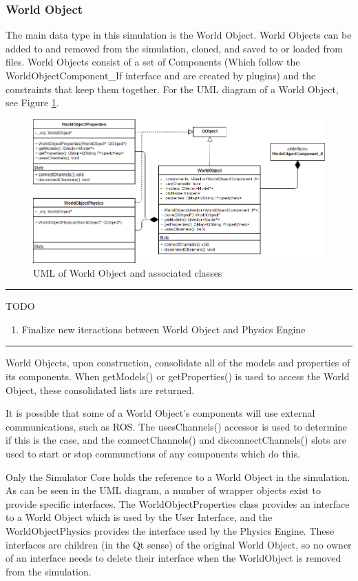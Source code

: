   \subsubsection*{World Object} \label{sec:worldobjclass}
	The main data type in this simulation is the World Object. World Objects can be added to and removed from the simulation, cloned, and saved to or loaded from files. World Objects consist of a set of Components (Which follow the WorldObjectComponent\_If interface and are created by plugins) and the constraints that keep them together. For the UML diagram of a World Object, see Figure \ref{uml:worldobj}.
	
 \begin{figure}[h]
 	\begin{center}
 	\includegraphics[scale=0.5]{./images_design/uml/WorldObj}
 	\caption{UML of World Object and associated classes\label{uml:worldobj}}
 	\end{center}
 \end{figure}
 \hrule	
	TODO
	\begin{enumerate}
		\item Finalize new iteractions between World Object and Physics Engine
	\end{enumerate}
\hrule
	World Objects, upon construction, consolidate all of the models and properties of its components. When getModels() or getProperties() is used to access the World Object, these consolidated lists are returned.
	
	It is possible that some of a World Object's components will use external communications, such as ROS. The usesChannels() accessor is used to determine if this is the case, and the connectChannels() and disconnectChannels() slots are used to start or stop communctions of any components which do this.
	
	Only the Simulator Core holds the reference to a World Object in the simulation. As can be seen in the UML diagram, a number of wrapper objects exist to provide specific interfaces. The WorldObjectProperties class provides an interface to a World Object which is used by the User Interface, and the WorldObjectPhysics provides the interface used by the Physics Engine. These interfaces are children (in the Qt sense) of the original World Object, so no owner of an interface needs to delete their interface when the WorldObject is removed from the simulation.
	
